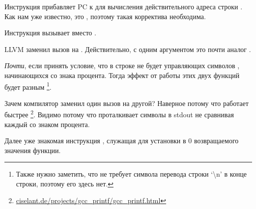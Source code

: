 Инструкция  прибавляет \ac{PC} к  для вычисления действительного адреса строки . Как нам уже известно, это \q{\PICcode}, поэтому такая корректива необходима.

Инструкция  вызывает \puts вместо \printf.

\label{puts}
LLVM заменил вызов \printf на \puts. 
Действительно, \printf с одним аргументом это почти аналог \puts.
 
\emph{Почти}, если принять условие, что в строке не будет управляющих символов \printf, 
начинающихся со знака процента. Тогда эффект от работы этих двух функций будет разным
\footnote{Также нужно заметить, что \puts не требует символа перевода строки `\textbackslash{}n' в конце строки,
поэтому его здесь нет.}.

Зачем компилятор заменил один вызов на другой? Наверное потому что \puts работает быстрее
\footnote{\href{http://go.yurichev.com/17063}{ciselant.de/projects/gcc\_printf/gcc\_printf.html}}. 
Видимо потому что \puts проталкивает символы в \gls{stdout} не сравнивая каждый со знаком процента.

Далее уже знакомая инструкция , служащая для установки в 0 возвращаемого значения функции.

